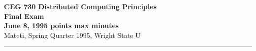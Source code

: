 \def\fat{\framebox[1mm]{\rule{0mm}{2mm}}}
\def\CSP{{\sc csp}}
\def\RPC{{\sc rpc}}
\def\SR{{\sc sr}}
\def\co{{\bf co}}
\def\oc{{\bf oc}}
\def\zand{\wedge}\def\zor{\vee}	\def\znot{\neg}
\def\ellipsis{\ldots}
\def\pbar{\parallel}
\def\lb{\langle}
\def\rb{\rangle}
\def\ra{\rightarrow}
\def\await{{\bf await}}
\parindent=0pt
\pagestyle{empty}



{\bf CEG 
\large \bf 730 Distributed Computing Principles\\[5pt]
\large Final Exam\\[10pt]
June 8, 1995  points max  minutes\\
}
\bigskip
{Mateti,  Spring Quarter 1995, Wright State U}\\[-5pt]
\hrule

